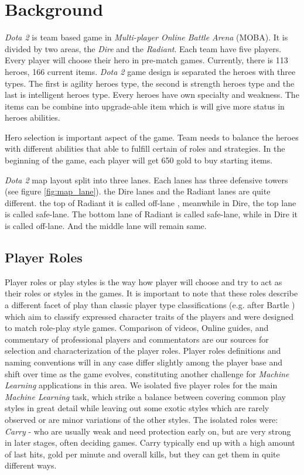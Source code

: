 \section{Background}
\label{sec:background}

\textit{Dota 2} is team based game in \textit{Multi-player Online Battle Arena} (MOBA). It is divided by two areas, the \textit{Dire} and the \textit{Radiant}. Each team have five players. Every player will choose their hero in pre-match games. Currently, there is 113 heroes, 166 current items. \textit{Dota 2} game design is separated the heroes with three types. The first is agility heroes type, the second is strength heroes type and the last is intelligent heroes type. Every heroes have own specialty and weakness. The items can be combine into upgrade-able item which is will give more status in heroes abilities.

Hero selection is important aspect of the game. Team needs to balance the heroes with different abilities that able to fulfill certain of roles and strategies. In the beginning of the game, each player will get 650 gold to buy starting items.

\textit{Dota 2} map layout split into three lanes. Each lanes has three defensive towers (see figure \ref{fig:map_lane}). the Dire lanes and the Radiant lanes are quite different. the top of Radiant it is called off-lane , meanwhile in Dire, the top lane is called safe-lane. The bottom lane of Radiant is called safe-lane, while in Dire it is called off-lane. And the middle lane will remain same.

\subsection{Player Roles}
\label{sec:player_roles}

Player roles or play styles is the way how player will choose and try to act as their roles or styles in the games. It is important to note that these roles describe a different facet of play than classic player type classifications (e.g. after Bartle \cite{bartle1996hearts}) which aim to classify expressed character traits of the players and were designed to match role-play style games. Comparison of videos, Online guides, and commentary of professional players and commentators are our sources for selection and characterization of the player roles. Player roles definitions and naming conventions will in any case differ slightly among the player base and shift over time as the game evolves, constituting another challenge for \textit{Machine Learning} applications in this area. We isolated five player roles for the main \textit{Machine Learning} task, which strike a balance between covering common play styles in great detail while leaving out some exotic styles which are rarely observed or are minor variations of the other styles. The isolated roles were: \textit{Carry} - who are usually weak and need protection early on, but are very strong in later stages, often deciding games. Carry typically end up with a high amount of last hits, gold per minute and overall kills, but they can get them in quite different ways.
